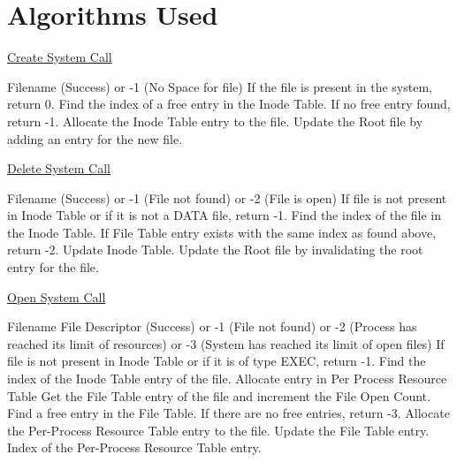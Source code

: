 \chapter{Algorithms Used}
\label{chap9}
\renewcommand{\algorithmicrequire}{\textbf{Input:}}
\renewcommand{\algorithmicensure}{\textbf{Output:}}

\begin{algorithm}
\caption{\href{http://exposnitc.github.io/os_design-files/create.html}{Create System Call}}
\begin{algorithmic}
\REQUIRE Filename
 (Success) or -1 (No Space for file)
\STATE If the file is present in the system, return 0.   
\STATE Find the index of a free entry in the Inode Table. If no free entry found, return -1.  
\STATE Allocate the Inode Table entry to the file.
\STATE Update the Root file by adding an entry for the new file.  
\end{algorithmic}
\end{algorithm}


\begin{algorithm}
\caption{\href{http://exposnitc.github.io/os_design-files/delete.html}{Delete System Call}}
\begin{algorithmic}
\REQUIRE Filename
 (Success) or -1 (File not found) or -2 (File is open)
\STATE If file is not present in Inode Table or if it is not a DATA file, return -1.
\STATE Find the index of the file in the Inode Table.
\STATE If File Table entry exists with the same index as found above, return -2. 
\STATE Update Inode Table.
\STATE Update the Root file by invalidating the root entry for the file.
\end{algorithmic}
\end{algorithm}


\begin{algorithm}
\caption{\href{http://exposnitc.github.io/os_design-files/open.html}{Open System Call}}
\begin{algorithmic}
\REQUIRE Filename
\ENSURE File Descriptor (Success) or -1 (File not found) or -2 (Process has reached its limit of resources) or -3 (System has reached its limit of open files)
\STATE If file is not present in Inode Table or if it is of type EXEC, return -1.
\STATE Find the index of the Inode Table entry of the file.
\STATE Allocate entry in Per Process Resource Table
    \STATE Get the File Table entry of the file and increment the File Open Count.
\ELSE
    \STATE Find a free entry in the File Table. If there are no free entries, return -3.
\ENDIF
\STATE Allocate the Per-Process Resource Table entry to the file.
\STATE Update the File Table entry.
\RETURN Index of the Per-Process Resource Table entry.
\end{algorithmic}
\end{algorithm}

